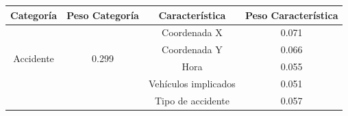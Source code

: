   \begin{table}[H]
    \small
    \centering
    \begin{tabular}{ |c|c|c|c| }
         \hline
         \textbf{Categoría} & \textbf{Peso Categoría} & \textbf{Característica} & \textbf{Peso Característica}\\

         \hline
         \multirow{4}{*}{Accidente}   & \multirow{4}{*}{0.299}        & Coordenada X          & 0.071\\
                                      &                               & Coordenada Y          & 0.066\\
                                      &                               & Hora                  & 0.055\\
                                      &                               & Vehículos implicados  & 0.051\\
                                      &                               & Tipo de accidente     & 0.057\\
         \hline

    \end{tabular}
  \end{table}
